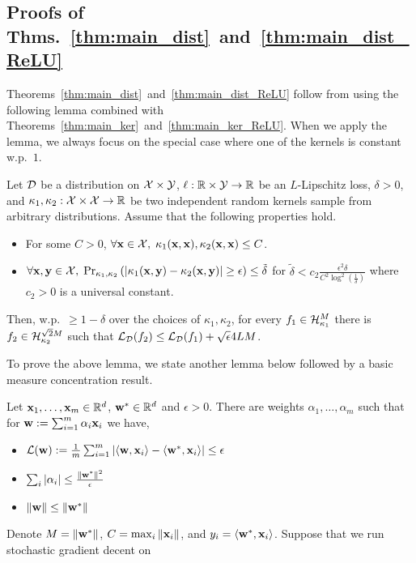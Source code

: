 \subsection{Proofs of Thms.~\ref{thm:main_dist}~and~\ref{thm:main_dist_ReLU}}
Theorems~\ref{thm:main_dist}~and~\ref{thm:main_dist_ReLU} follow from using
the following lemma combined with
Theorems~\ref{thm:main_ker}~and~\ref{thm:main_ker_ReLU}. When we apply
the lemma, we always focus on the special case where one of the kernels is
constant w.p.\ $1$.
\begin{lemma} 
	\label{lem:app_ker_app_act}
Let ${\cal D}$ be a distribution on ${\cal X}\times{\cal Y}$, $\ell:{\mathbb R}\times{\cal Y}\to{\mathbb R}$
be an $L$-Lipschitz loss, $\delta>0$, and $\kappa_1,\kappa_2:{\cal X}\times{\cal X}\to{\mathbb R}$ be two
independent random kernels sample from arbitrary distributions.
Assume that the following properties hold.
	\begin{itemize}
		\item For some $C>0$, $\forall {\mathbf x}\in {\cal X},\;
			\kappa_1({\mathbf x},{\mathbf x}),\kappa_2({\mathbf x},{\mathbf x})\le C$.
		\item $\forall {\mathbf x},{\mathbf y}\in
			{\cal X},\;\Pr_{\kappa_1,\kappa_2}
				\left(|\kappa_1({\mathbf x},{\mathbf y})-\kappa_2({\mathbf x},{\mathbf y})|\ge \epsilon\right)\le \tilde{\delta}$
				for $\tilde{\delta} < c_2 \frac{\epsilon^2\delta}{C^2\log^2\left(\frac{1}{\delta}\right)}$ where $c_2>0$ is a
				universal constant.
	\end{itemize}
	Then, w.p.\ $\ge 1-\delta$ over the choices of $\kappa_1,\kappa_2$, for every
	$f_1\in {\cal H}^{M}_{\kappa_1}$ there is $f_2\in{\cal H}^{\sqrt{2}M}_{\kappa_2}$ such that ${\cal L}_{{\cal D}}(f_2)\le {\cal L}_{{\cal D}}(f_1) + \sqrt{\epsilon}4LM$.
\end{lemma}
\noindent
To prove the above lemma, we state another lemma below followed by a basic
measure concentration result.
\begin{lemma}\label{lem:small_norm_small_l1}
Let ${\mathbf x}_1,\ldots,{\mathbf x}_m\in {\mathbb R}^d$, ${\mathbf w}^*\in{\mathbb R}^d$ and
$\epsilon>0$. There are weights $\alpha_1,\ldots,\alpha_m$
such that for ${\mathbf w}:=\sum_{i=1}^m\alpha_i{\mathbf x}_i$ we have,
\begin{itemize}
	\item ${\cal L}({\mathbf w}):=\frac{1}{m}\sum_{i=1}^m|\langle {\mathbf w},{\mathbf x}_i \rangle-\langle {\mathbf w}^*,{\mathbf x}_i \rangle|\le\epsilon$
	\item $\sum_i |\alpha_i| \le \frac{\|{\mathbf w}^*\|^2}{\epsilon}$
	\item $\|{\mathbf w}\| \le \|{\mathbf w}^*\|$
\end{itemize}
\end{lemma}
\proof
Denote $M=\|{\mathbf w}^*\|$, $C = \max_i \|{\mathbf x}_i\|$, and
$y_i=\langle {\mathbf w}^*,{\mathbf x}_i \rangle$. Suppose that we run stochastic gradient decent on
